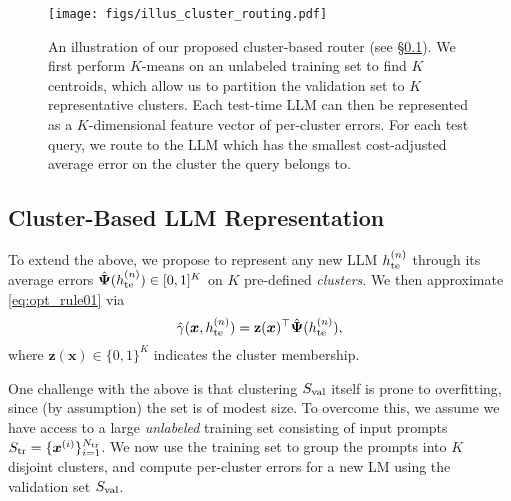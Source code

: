 \ifarxiv
\begin{figure}
    \centering
    \texttt{[image: figs/illus\_cluster\_routing.pdf]}
    \caption{An illustration of our proposed cluster-based router (see \S\ref{sec:cluster_router}). 
    We first perform $K$-means on an unlabeled training set to find $K$ centroids, which allow us to partition the validation set to $K$ representative clusters. 
    Each test-time LLM can then be represented as a $K$-dimensional feature vector of per-cluster errors. For each test query, we route to the LLM which has the smallest cost-adjusted average error on the cluster the query belongs to.
    }
    \label{fig:illus_cluster}
\end{figure}
\fi


\subsection{Cluster-Based LLM Representation}
\label{sec:cluster_router}



To extend the above, we propose
to represent any new LLM $h_{\mathrm{te}}^{( n )}$ through its average errors 
$\hat{\boldsymbol{\Psi}}( h_{\mathrm{te}}^{( n )} ) \in [0,1]^K$
on $K$ pre-defined \emph{clusters}. 
We then approximate 
\eqref{eq:opt_rule01} via 
$$ \hat{\gamma}( \boldsymbol{x}, h_{\mathrm{te}}^{( n )} ) = \mathbf{z}( \boldsymbol{x} )^\top \hat{\boldsymbol{\Psi}}( h_{\mathrm{te}}^{( n )} ), $$
where $\mathbf{z}( \boldsymbol{x} ) \in \{ 0,1 \}^K$ indicates the cluster membership.


One challenge with the above
is that clustering $S_{\textrm{val}}$ itself is prone to overfitting,
since (by assumption) the set is of modest size.
To overcome this,
we assume we have access to a large
\emph{unlabeled} training set consisting of input prompts $S_{\textrm{tr}} = \{\boldsymbol{x}^{(i)}\}_{i=1}^{N_{\textrm{tr}}}$.
We now
use the training set to  group the prompts into $K$ disjoint clusters, and compute per-cluster errors for a new LM using the validation set $S_{\textrm{val}}$. %


